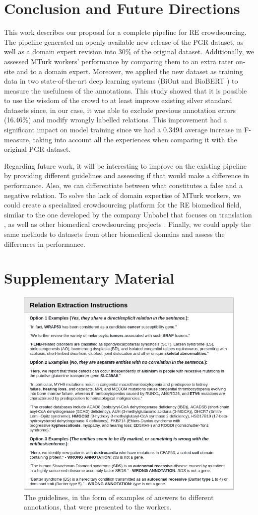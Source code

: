 \section{Conclusion and Future Directions}

This work describes our proposal for a complete pipeline for RE crowdsourcing. The pipeline  generated an openly available new release of the PGR dataset, as well as a domain expert revision into 30\% of the original dataset. Additionally, we assessed MTurk workers' performance by comparing them to an extra rater on-site and to a domain expert.   Moreover, we applied the new dataset as training data in two state-of-the-art deep learning systems (BiOnt \citep{sousa2020biont} and BioBERT \citep{lee2020biobert}) to measure the usefulness of the annotations. This study showed that it is possible to use the wisdom of the crowd to at least improve existing silver standard datasets since, in our case, it was able to exclude previous annotation errors (16.46\%) and modify wrongly labelled relations. This improvement had a significant impact on model training since we had a 0.3494 average increase in F-measure, taking into account all the experiences when comparing it with the original PGR dataset. 

Regarding future work, it will be interesting to improve on the existing pipeline by providing different guidelines and assessing if that would make a difference in performance. Also, we can differentiate between what constitutes a false and a negative relation. To solve the lack of domain expertise of MTurk workers, we could create a specialized crowdsourcing platform for the RE biomedical field, similar to the one developed by the company Unbabel that focuses on translation \citep{gracca2018unbabel}, as well as other biomedical crowdsourcing projects \citep{tsueng2020applying,kleffner2017foldit}. Finally, we could apply the same methods to datasets from other biomedical domains and assess the differences in performance. 

\clearpage
\section{Supplementary Material}


\begin{figure}[h]
\centering
\includegraphics[width=0.8\linewidth]{images/chapter_6/supplementary_material_figure_1.jpg}
\caption[Amazon MTurk Guidelines]{The guidelines, in the form of examples of answers to different annotations, that were presented to the workers.} \label{sfig1}
\end{figure}

